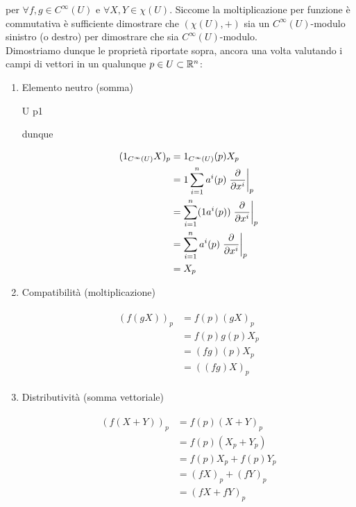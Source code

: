 per $ \forall f,g \in C^{\infty}(U) $ e $ \forall X,Y \in \chi(U) $. Siccome la moltiplicazione per funzione è commutativa è sufficiente dimostrare che $ (\chi(U),+) $ sia un $ C^{\infty}(U) $-modulo sinistro (o destro) per dimostrare che sia $ C^{\infty}(U) $-modulo.\\
Dimostriamo dunque le proprietà riportate sopra, ancora una volta valutando i campi di vettori in un qualunque $ p \in U \subset \mathbb{R}^{n} $:

\begin{enumerate}
	\item Elemento neutro (somma)
	
		{U}{\R}
		{p}{1}
	
	dunque
	
	\begin{align}
		\begin{split}
			(1_{C^{\infty}(U)} X)_{p} &= 1_{C^{\infty}(U)} (p) X_{p}\\
			&= 1 \sum_{i=1}^{n} a^{i} (p) \eval{ \pdv{x^{i}} }_{p}\\
			&= \sum_{i=1}^{n} (1 a^{i} (p)) \eval{ \pdv{x^{i}} }_{p}\\
			&= \sum_{i=1}^{n} a^{i} (p) \eval{ \pdv{x^{i}} }_{p}\\
			&= X_{p}
		\end{split}
	\end{align}
	
	\item Compatibilità (moltiplicazione)
	
	\begin{align}
		\begin{split}
			(f (g X))_{p} &= f (p) (g X)_{p}\\
			&= f (p) g (p) X_{p}\\
			&= (f g) (p) X_{p}\\
			&= ((f g) X)_{p}
		\end{split}
	\end{align}
	
	\item Distributività (somma vettoriale)
	
	\begin{align}
		\begin{split}
			(f (X + Y))_{p} &= f (p) (X + Y)_{p}\\
			&= f (p) (X_{p} + Y_{p})\\
			&= f (p) X_{p} + f (p) Y_{p}\\
			&= (f X)_{p} + (f Y)_{p}\\
			&= (f X + f Y)_{p}
		\end{split}
	\end{align}
	

\end{enumerate}
